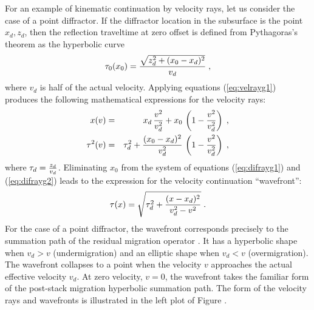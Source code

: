 For an example of kinematic continuation by velocity rays, let us
consider the case of a point diffractor. If the diffractor location in
the subsurface is the point ${x_d,z_d}$, then the reflection traveltime at
zero offset is defined from Pythagoras's theorem as the hyperbolic
curve
\begin{equation}
\tau_0(x_0) = {{\sqrt{z_d^2 + (x_0 - x_d)^2}} \over v_d}\;,
\label{eq:dift0}
\end{equation}
where $v_d$ is half of the actual velocity. Applying equations
(\ref{eq:velrayg1}) produces the following mathematical expressions
for the velocity rays:
\begin{eqnarray}
x(v) & = & x_d\,{v^2 \over v_d^2} + 
x_0\,\left(1 -  {v^2 \over v_d^2}\right)\;,
\label{eq:difrayg1} \\ 
\tau^2(v) & = & \tau_d^2 + {{(x_0 - x_d)^2} \over v_d^2}\,
\left(1 -  {v^2 \over v_d^2}\right)\;,
\label{eq:difrayg2} 
\end{eqnarray}
where $\tau_d = {z_d \over v_d}$.
Eliminating $x_0$ from the system of equations (\ref{eq:difrayg1}) and
(\ref{eq:difrayg2}) leads to the expression for the velocity continuation
``wavefront'': 
\begin{equation}
\tau(x)=\sqrt{\tau_d^2 + {{(x - x_d)^2} \over {v_d^2 - v^2}}}\;.
\label{eq:diffront}
\end{equation}
For the case of a point diffractor, the wavefront corresponds precisely
to the summation path of the residual migration operator
\cite[]{GEO50.01.01100126}. It has a hyperbolic shape when $v_d > v$
(undermigration) and an elliptic shape when $v_d < v$
(overmigration). The wavefront collapses to a point when the velocity
$v$ approaches the actual effective velocity $v_d$. At zero
velocity, $v=0$, the wavefront takes the familiar form of the post-stack migration
hyperbolic summation path. The form of the velocity rays and wavefronts
is illustrated in the left plot of Figure .



